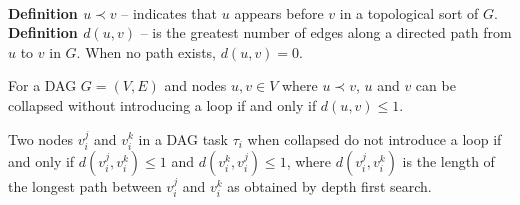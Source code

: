  \\
\textbf{Definition ${u \prec v}$} -- indicates that ${u}$ appears
before ${v}$ in a topological sort of ${G}$. \\
\textbf{Definition ${d(u, v)}$} -- is the greatest number of edges
along a directed path from ${u}$ to ${v}$ in ${G}$. When no path
exists, ${d(u,v) = 0}$.

\begin{theorem}
  For a DAG ${G = (V, E)}$ and nodes ${u, v \in V}$ where ${u \prec
    v}$, ${u}$ and ${v}$ can be collapsed without introducing a loop
  if and  only if ${d(u, v) \le 1}$.
\end{theorem}


\begin{theorem} \label{thrm:candidacy-collapse} Two nodes $v_i^j$ and $v_i^k$ in a DAG task $\tau_i$ when collapsed do not introduce a loop if and only if $d(v_i^j, v_i^k) \le 1$ and $d(v_i^k, v_i^j) \le 1$, where $d(v_i^j, v_i^k)$ is the length of the longest path between $v_i^j$ and $v_i^k$ as obtained by depth first search. \end{theorem}
